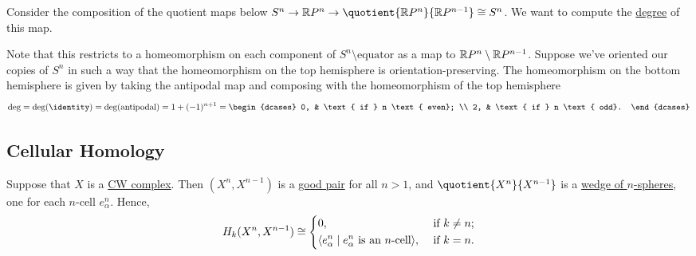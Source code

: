 \begin{eg}
	Consider the composition of the quotient maps below \(S^n \to \mathbb{\MakeUppercase{r}} P^n \to \quotient{\mathbb{\MakeUppercase{r}} P^n}{\mathbb{\MakeUppercase{r}} P^{n - 1}} \cong S^n\).
	We want to compute the \hyperref[def:degree]{degree} of this map.

	Note that this restricts to a homeomorphism on each component of \(S^n \setminus \text{equator}\) as a map to \(\mathbb{\MakeUppercase{r}}P^n \setminus \mathbb{\MakeUppercase{r}} P^{n - 1}\).
	Suppose we've oriented our copies of \(S^n\) in such a way that the homeomorphism on the top hemisphere is orientation-preserving. The homeomorphism on the bottom hemisphere
	is given by taking the antipodal map and composing with the homeomorphism of the top hemisphere
	\[
		\deg = \deg(\identity) = \deg(\text{antipodal}) = 1 + (-1)^{n + 1} = \begin{dcases}
			0, & \text{ if }  n \text{ even}; \\
			2, & \text{ if }  n \text{ odd}.
		\end{dcases}
	\]
\end{eg}

\subsection{Cellular Homology}
Suppose that \(X\) is a \hyperref[def:CW-Complex]{CW complex}. Then \((X^n, X^{n - 1})\) is a \hyperref[def:good-pair]{good pair} for all \(n > 1\), and
\(\quotient{X^n}{X^{n - 1}}\) is a \hyperref[sssec:Wedge-sum]{wedge of \(n\)-spheres}, one for each \(n\)-cell \(e^n_\alpha\). Hence,
\[
	H_k(X^n, X^{n - 1}) \cong \begin{dcases}
		0,                                                                    & \text{ if } k\neq n ; \\
		\langle e_\alpha^n \mid  e_\alpha^n \text{ is an \(n\)-cell} \rangle, & \text{ if } k = n .
	\end{dcases}
\]

